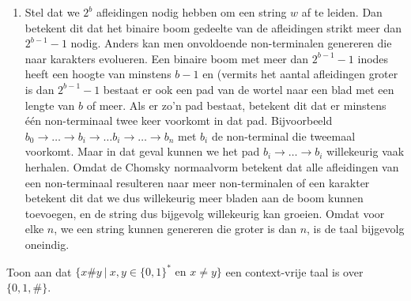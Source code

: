 \documentclass[a4paper]{article}
\newtheorem{lemma}{Lemma}
\begin{document}
\begin{question}
\begin{answer}
\begin{enumerate}
\begin{lemma}
 \end{lemma}
 \item Stel dat we $2^b$ afleidingen nodig hebben om een string $w$ af te leiden. Dan betekent dit dat het binaire boom gedeelte van de afleidingen strikt meer dan $2^{b-1}-1$ nodig. Anders kan men onvoldoende non-terminalen genereren die naar karakters evolueren. Een binaire boom met meer dan $2^{b-1}-1$ inodes heeft een hoogte van minstens $b-1$ en (vermits het aantal afleidingen groter is dan $2^{b-1}-1$ bestaat er ook een pad van de wortel naar een blad met een lengte van $b$ of meer. Als er zo'n pad bestaat, betekent dit dat er minstens \'e\'en non-terminaal twee keer voorkomt in dat pad. Bijvoorbeeld $b_0\rightarrow\ldots\rightarrow b_i\rightarrow\ldots b_i\rightarrow\ldots\rightarrow b_n$ met $b_i$ de non-terminal die tweemaal voorkomt. Maar in dat geval kunnen we het pad $b_i\rightarrow\ldots\rightarrow b_i$ willekeurig vaak herhalen. Omdat de Chomsky normaalvorm betekent dat alle afleidingen van een non-terminaal resulteren naar meer non-terminalen of een karakter betekent dit dat we dus willekeurig meer bladen aan de boom kunnen toevoegen, en de string dus bijgevolg willekeurig kan groeien. Omdat voor elke $n$, we een string kunnen genereren die groter is dan $n$, is de taal bijgevolg oneindig.
\end{enumerate}
\end{answer}
\end{question}

\begin{question}
Toon aan dat $\{ x \# y \ | \ \text{$x,y \in \{0,1\}^*$ en $x \neq y$} \}$ een context-vrije taal is over $\{ 0,1,\# \}$.
\end{question}
\end{document}
